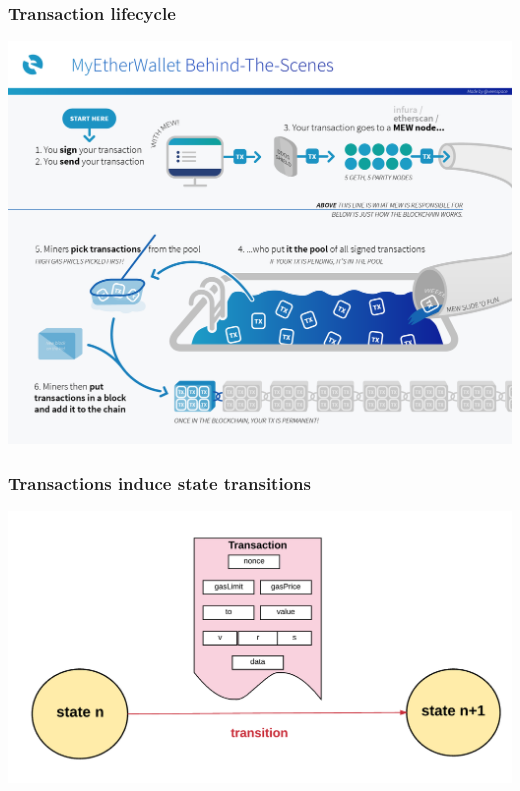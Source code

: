 \documentclass[11pt]{beamer}  %
\begin{document}
\begin{frame}\frametitle{Transaction lifecycle}

  \begin{center}
    \includegraphics[scale=0.135,clip=false]{pictures/ethereum-transaction-life.png}
  \end{center}

\end{frame}

\begin{frame}\frametitle{Transactions induce state transitions}

  \begin{center}
    \includegraphics[width=\textwidth,clip=false]{pictures/state-transition.png}
  \end{center}

\end{frame}
\end{document}
